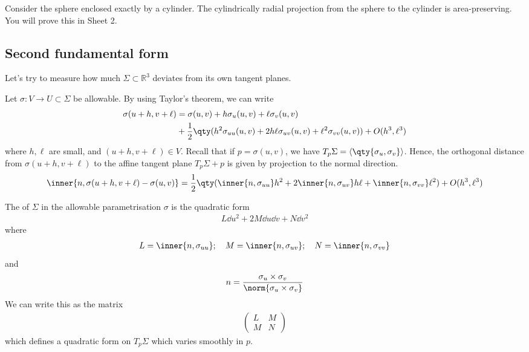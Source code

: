 \begin{example}
	Consider the sphere enclosed exactly by a cylinder.
	The cylindrically radial projection from the sphere to the cylinder is area-preserving.
	You will prove this in Sheet 2.
\end{example}

\subsection{Second fundamental form}
Let's try to measure how much $\Sigma \subset \mathbb{R}^3$ deviates from its own tangent planes.

Let $\sigma \colon V \to U \subset \Sigma$ be allowable.
By using Taylor's theorem, we can write
\begin{align*}
	\sigma(u+h,v+\ell) &= \sigma(u,v) + h \sigma_u(u,v) + \ell \sigma_v(u,v) \\ &+ \frac{1}{2} \qty(h^2 \sigma_{uu}(u,v) + 2h\ell \sigma_{uv}(u,v) + \ell^2 \sigma_{vv}(u,v)) + O(h^3,\ell^3)
\end{align*}
where $h,\ell$ are small, and $(u+h,v+\ell) \in V$.
Recall that if $p = \sigma(u,v)$, we have $T_p \Sigma = \genset{\qty{\sigma_u,\sigma_v}}$.
Hence, the orthogonal distance from $\sigma(u+h,v+\ell)$ to the affine tangent plane $T_p \Sigma + p$ is given by projection to the normal direction.
\begin{align*}
	\inner{n,\sigma(u+h,v+\ell) - \sigma(u,v)} = \frac{1}{2} \qty(\inner{n,\sigma_{uu}} h^2 + 2\inner{n,\sigma_{uv}} h\ell + \inner{n,\sigma_{vv}}\ell^2) + O(h^3,\ell^3)
\end{align*}

\begin{definition}
	The  of $\Sigma$ in the allowable parametrisation $\sigma$ is the quadratic form
	\begin{align*}
		L \dd{u}^2 + 2 M \dd{u} \dd{v} + N \dd{v}^2
	\end{align*}
	where
	\begin{align*}
		L = \inner{n,\sigma_{uu}};\quad M = \inner{n,\sigma_{uv}};\quad N = \inner{n,\sigma_{vv}}
	\end{align*}
	and
	\begin{align*}
		n = \frac{\sigma_u \times \sigma_v}{\norm{\sigma_u \times \sigma_v}}
	\end{align*}
	We can write this as the matrix
	\begin{align*}
		\begin{pmatrix}
			L & M \\
			M & N
		\end{pmatrix}
	\end{align*}
	which defines a quadratic form on $T_p \Sigma$ which varies smoothly in $p$.
\end{definition}

